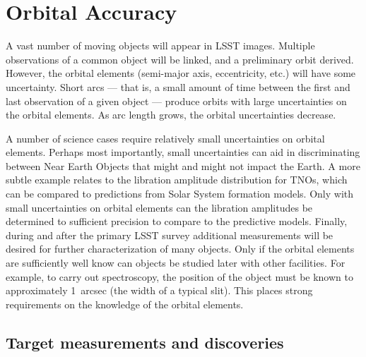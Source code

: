 %
%

\section{Orbital Accuracy}
\def\secname{\chpname:orbits}\label{sec:\secname}


A vast number of moving objects will appear in LSST images. Multiple
observations of a common object will be linked, and a preliminary orbit
derived. However, the orbital elements (semi-major axis, eccentricity,
etc.) will have some uncertainty. Short arcs --- that is, a small amount
of time between the first and last observation of a given object ---
produce orbits with large uncertainties on the orbital elements. As arc
length grows, the orbital uncertainties decrease.

A number of science cases require relatively small uncertainties on
orbital elements. Perhaps most importantly, small uncertainties can aid
in discriminating between Near Earth Objects that might and might not
impact the Earth. A more subtle example relates to the libration
amplitude distribution for TNOs, which can be compared to predictions
from Solar System formation models. Only with small uncertainties on
orbital elements can the libration amplitudes be determined to
sufficient precision to compare to the predictive models. Finally,
during and after the primary LSST survey additional measurements will be
desired for further characterization of many objects. Only if the
orbital elements are sufficiently well know can objects be studied later
with other facilities. For example, to carry out spectroscopy, the
position of the object must be known to approximately 1~arcsec (the
width of a typical slit). This places strong requirements on the
knowledge of the orbital elements.



\subsection{Target measurements and discoveries}
\label{sec:\secname:targets}


